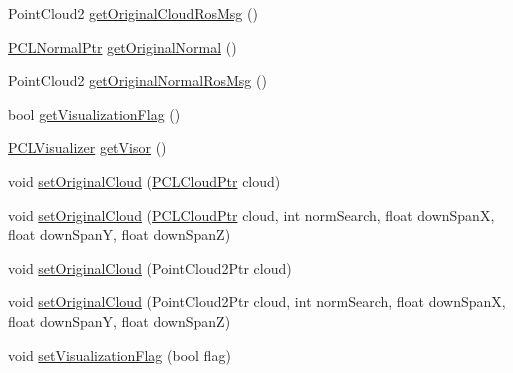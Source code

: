 \begin{DoxyCompactItemize}
\item 
Point\-Cloud2 \hyperlink{classpcm_1_1PCManager_a1a11270e78e96c38f9c40985529fc5b6}{get\-Original\-Cloud\-Ros\-Msg} ()
\item 
\hyperlink{pc__primitive_8h_a1bc38ce8b0c26e5f2d28fae9f3e3ea97}{P\-C\-L\-Normal\-Ptr} \hyperlink{classpcm_1_1PCManager_a471d768a4a32a8d8992c688fc6fc2f58}{get\-Original\-Normal} ()
\item 
Point\-Cloud2 \hyperlink{classpcm_1_1PCManager_a01a64a81b18e5bc984c46910d2a881be}{get\-Original\-Normal\-Ros\-Msg} ()
\item 
bool \hyperlink{classpcm_1_1PCManager_a4d419e1bf7e35f8f3ddbb7f640c50a72}{get\-Visualization\-Flag} ()
\item 
\hyperlink{pc__manager_8h_a38c805dbc7ad6f06109b85c8e540817a}{P\-C\-L\-Visualizer} \hyperlink{classpcm_1_1PCManager_ac1cfd8753c305e761a3c5914f74cca7b}{get\-Visor} ()
\item 
void \hyperlink{classpcm_1_1PCManager_a2144cf37b92d58e902f7e6b1dcb6984d}{set\-Original\-Cloud} (\hyperlink{pc__primitive_8h_aa14a240c8d999c4f56133c0f70e88783}{P\-C\-L\-Cloud\-Ptr} cloud)
\item 
void \hyperlink{classpcm_1_1PCManager_ac277411304ee22415cdeaad26cd4721c}{set\-Original\-Cloud} (\hyperlink{pc__primitive_8h_aa14a240c8d999c4f56133c0f70e88783}{P\-C\-L\-Cloud\-Ptr} cloud, int norm\-Search, float down\-Span\-X, float down\-Span\-Y, float down\-Span\-Z)
\item 
void \hyperlink{classpcm_1_1PCManager_a8eafedbcc9cb93380e826bc45bff1410}{set\-Original\-Cloud} (Point\-Cloud2\-Ptr cloud)
\item 
void \hyperlink{classpcm_1_1PCManager_aa5bd3ef55ff3ef39cded25351c7b4d9e}{set\-Original\-Cloud} (Point\-Cloud2\-Ptr cloud, int norm\-Search, float down\-Span\-X, float down\-Span\-Y, float down\-Span\-Z)
\item 
void \hyperlink{classpcm_1_1PCManager_a40c79e3197147779d263b95fd3617974}{set\-Visualization\-Flag} (bool flag)
\end{DoxyCompactItemize}
